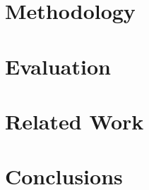 \documentclass[letterpaper]{article}
\begin{document}


\section{Methodology}



\section{Evaluation}



\section{Related Work}



\section{Conclusions}






\end{document}

